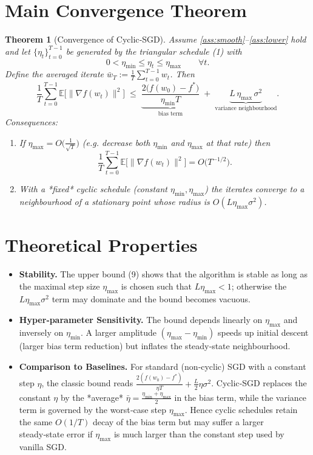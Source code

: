 \documentclass{article}
\newtheorem{theorem}{Theorem}
\begin{document}
\section*{Main Convergence Theorem}
\begin{theorem}[Convergence of Cyclic‑SGD]\label{thm:main}
Assume \ref{ass:smooth}–\ref{ass:lower} hold and let $\{\eta_t\}_{t=0}^{T-1}$ be generated by the triangular schedule (1) with
\[
0<\eta_{\min}\le\eta_t\le\eta_{\max}\qquad\forall t .
\tag{8}
\]
Define the averaged iterate $\bar w_T:=\frac{1}{T}\sum_{t=0}^{T-1}w_t$.  
Then
\[
\frac{1}{T}\sum_{t=0}^{T-1}\mathbb{E}\!\big[\|\nabla f(w_t)\|^{2}\big]
\;\le\;
\underbrace{\frac{2\big(f(w_{0})-f^{*}\big)}{\eta_{\min}T}}_{\text{bias term}}
\;+\;
\underbrace{L\,\eta_{\max}\,\sigma^{2}}_{\text{variance neighbourhood}} .
\tag{9}
\]
Consequences:
\begin{enumerate}
\item If $\eta_{\max}=O\!\big(\tfrac{1}{\sqrt{T}}\big)$ (e.g. decrease both $\eta_{\min}$ and $\eta_{\max}$ at that rate) then
\[
\frac{1}{T}\sum_{t=0}^{T-1}\mathbb{E}\!\big[\|\nabla f(w_t)\|^{2}\big]=O\!\big(T^{-1/2}\big).
\]
\item With a *fixed* cyclic schedule (constant $\eta_{\min},\eta_{\max}$) the iterates converge to a neighbourhood of a stationary point whose radius is $O(L\eta_{\max}\sigma^{2})$.
\end{enumerate}
\end{theorem}

\section*{Theoretical Properties}
\begin{itemize}
\item \textbf{Stability.} The upper bound (9) shows that the algorithm is stable as long as the maximal step size $\eta_{\max}$ is chosen such that $L\eta_{\max}<1$; otherwise the $L\eta_{\max}\sigma^{2}$ term may dominate and the bound becomes vacuous.
\item \textbf{Hyper‑parameter Sensitivity.} The bound depends linearly on $\eta_{\max}$ and inversely on $\eta_{\min}$. A larger amplitude $(\eta_{\max}-\eta_{\min})$ speeds up initial descent (larger bias term reduction) but inflates the steady‑state neighbourhood.
\item \textbf{Comparison to Baselines.} For standard (non‑cyclic) SGD with a constant step $\eta$, the classic bound reads $\frac{2(f(w_0)-f^{*})}{\eta T}+ \tfrac{L}{2}\eta\sigma^{2}$. Cyclic‑SGD replaces the constant $\eta$ by the *average* $\bar\eta=\frac{\eta_{\min}+\eta_{\max}}{2}$ in the bias term, while the variance term is governed by the worst‑case step $\eta_{\max}$. Hence cyclic schedules retain the same $O(1/T)$ decay of the bias term but may suffer a larger steady‑state error if $\eta_{\max}$ is much larger than the constant step used by vanilla SGD.
\end{itemize}
\end{document}
